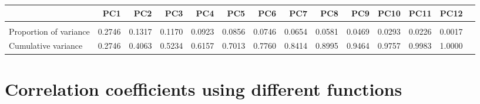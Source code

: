 \documentclass{report}
\begin{document}
\begin{adjustbox}{max width=\textwidth}
\begin{tabular}{l || *{13}{r}}
 & PC1 & PC2 & PC3 & PC4 & PC5 & PC6 & PC7 & PC8 & PC9 & PC10 & PC11 & PC12\\
\hline \\Proportion of variance & 0.2746 & 0.1317 & 0.1170 & 0.0923 & 0.0856 & 0.0746 & 0.0654 & 0.0581 & 0.0469 & 0.0293 & 0.0226 & 0.0017\\
Cumulative variance &0.2746 & 0.4063 & 0.5234 & 0.6157 & 0.7013 & 0.7760 & 0.8414 & 0.8995 & 0.9464 & 0.9757 & 0.9983 & 1.0000\\
\end{tabular}
\end{adjustbox}
\section{Correlation coefficients using different functions}
\end{document}
